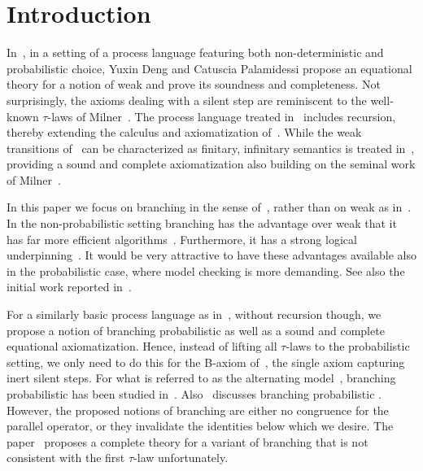 


\section{Introduction}

In~\cite{DP07:tcs}, in a setting of a process language featuring both
non-deterministic and probabilistic choice, Yuxin Deng and Catuscia
Palamidessi propose an equational theory for a notion of weak
{\bisimilarity} and prove its soundness and completeness. Not
surprisingly, the axioms dealing with a silent step are reminiscent to
the well-known $\tau$-laws of Milner~\cite{Mil89:phi,Mil89:ic}. The process
language treated in~\cite{DP07:tcs} includes recursion, thereby
extending the calculus and axiomatization of~\cite{BS01:icalp}. While
the weak transitions of~\cite{DP07:tcs} can be characterized as
finitary, infinitary semantics is treated in~\cite{FG19:jlamp},
providing a sound and complete axiomatization also building
on the seminal work of Milner~\cite{Mil89:ic}.

In this paper we focus on branching {\bisimilarity} in the sense
of~\cite{GW96:jacm}, rather than on weak {\bisimilarity} as
in~\cite{BS01:icalp,DP07:tcs,FG19:jlamp}. 
In the non-probabilistic setting branching {\bisimilarity} has the
advantage over weak {\bisimilarity} that it has far more efficient
algorithms~\cite{GJKW17:tcl,GV90:icalp}. Furthermore, it has a strong
logical underpinning~\cite{DV95:jacm}. It would be very attractive to
have these advantages available also in the probabilistic case, where
model checking is more demanding. See also the initial work reported
in~\cite{GV17:festschrift}.

For a similarly basic process language as in~\cite{DP07:tcs}, without
recursion though, we propose a notion of branching probabilistic {\bisimilarity}
as well as a sound and complete equational axiomatization. Hence,
instead of lifting 
all $\tau$-laws to the probabilistic setting, we only need to do this
for the B-axiom of~\cite{GW96:jacm}, the single axiom capturing inert
silent steps. For what is referred to as the alternating
model~\cite{HJ90:rtss}, branching probabilistic {\bisimilarity} has been
studied in~\cite{AGT12:tcs,AW06:tcs}. Also~\cite{Seg95:thesis}
discusses branching probabilistic {\bisimilarity}. However, the proposed
notions of branching {\bisimilarity} are either no congruence for the
parallel operator, or they invalidate the identities below which we
desire. The paper~\cite{AG09:sofsem} proposes a complete theory for a
variant of branching {\bisimilarity} that is not consistent with the
first $\tau$-law unfortunately.

